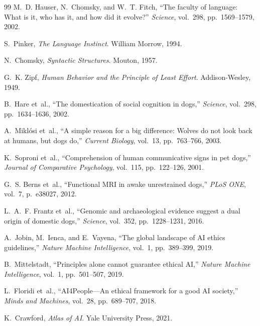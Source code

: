 \begin{thebibliography}{99}
M.~D. Hauser, N.~Chomsky, and W.~T. Fitch, ``The faculty of language: What is it,
who has it, and how did it evolve?'' \emph{Science}, vol.~298,
pp.~1569--1579, 2002.

S.~Pinker, \emph{The Language Instinct}. William Morrow, 1994.

N.~Chomsky, \emph{Syntactic Structures}. Mouton, 1957.

G.~K. Zipf, \emph{Human Behavior and the Principle of Least Effort}.
Addison-Wesley, 1949.

B.~Hare et~al., ``The domestication of social cognition in dogs,''
\emph{Science}, vol.~298, pp.~1634--1636, 2002.

A.~Mikl\'osi et~al., ``A simple reason for a big difference: Wolves do not look
back at humans, but dogs do,'' \emph{Current Biology}, vol.~13,
pp.~763--766, 2003.

K.~Soproni et~al., ``Comprehension of human communicative signs in pet dogs,''
\emph{Journal of Comparative Psychology}, vol.~115, pp.~122--126, 2001.

G.~S. Berns et~al., ``Functional MRI in awake unrestrained dogs,''
\emph{PLoS ONE}, vol.~7, p.~e38027, 2012.

L.~A.~F. Frantz et~al., ``Genomic and archaeological evidence suggest a dual
origin of domestic dogs,'' \emph{Science}, vol.~352, pp.~1228--1231, 2016.

A.~Jobin, M.~Ienca, and E.~Vayena, ``The global landscape of AI ethics
guidelines,'' \emph{Nature Machine Intelligence}, vol.~1, pp.~389--399, 2019.

B.~Mittelstadt, ``Principles alone cannot guarantee ethical AI,''
\emph{Nature Machine Intelligence}, vol.~1, pp.~501--507, 2019.

L.~Floridi et~al., ``AI4People---An ethical framework for a good AI society,''
\emph{Minds and Machines}, vol.~28, pp.~689--707, 2018.

K.~Crawford, \emph{Atlas of AI}. Yale University Press, 2021.


\end{thebibliography}
